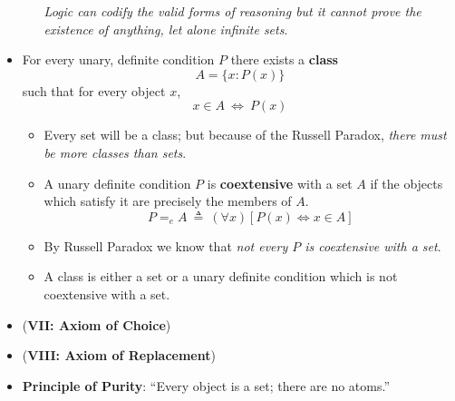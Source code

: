 \documentclass{myproc}
\begin{document}
\begin{itemize}
\begin{itemize}
		{\em{}Logic 
		can codify the valid forms of reasoning but it
		cannot prove the existence of anything, let alone infinite
		sets\/}.
	\end{itemize}
\item For every unary, definite condition $P$ there
	exists a {\bf{}class} 
		\[ A = \{x : P(x)\} \]
	such that for every object $x$,
		\[ x \in A \ \Leftrightarrow\ P(x)\]
		\begin{itemize}
		\item Every set will be a class; but because of the Russell Paradox,
			{\em{}there must be more classes than sets\/}.
		\item A unary definite condition $P$ is {\bf{}coextensive} with
			a set $A$ if the objects which satisfy it are
			precisely the members of $A$.
			\[ P =_e A \ \triangleq\ 
			(\forall{x})[P(x) \Leftrightarrow x \in A] \]
		\item By Russell Paradox we know that {\em{}not every $P$ is
			coextensive with a set\/}.
		\item A class is either a set or a unary definite condition
			which is not coextensive with a set.
		\end{itemize}
\item ({\bf{}VII: Axiom of Choice})
\item ({\bf{}VIII: Axiom of Replacement})
\item {\bf{}Principle of Purity}: ``Every object is a set; there are no
	atoms.''
	
\end{itemize}
\end{document}
